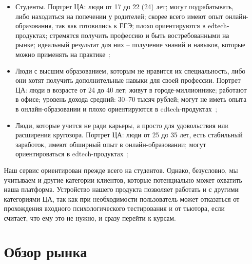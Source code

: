 \documentclass[12pt]{article}
\begin{document}
\begin{itemize}
    \item Студенты. Портрет ЦА: люди от 17 до 22 (24) лет; могут подрабатывать, либо находиться на попечении у родителей; скорее всего имеют опыт онлайн-образования, так как готовились к ЕГЭ; плохо ориентируются в edtech-продуктах; стремятся получить профессию и быть востребованными на рынке; идеальный результат для них -- получение знаний и навыков, которые можно применять на практике~\cite{TinkoffStudy};
    \item Люди с высшим образованием, которым не нравится их специальность, либо они хотят получить дополнительные навыки для своей профессии. Портрет ЦА: люди в возрасте от 24 до 40 лет; живут в городе-миллионнике; работают в офисе; уровень дохода средний: 30–70 тысяч рублей; могут не иметь опыта в онлайн-образовании и плохо ориентируются в edtech-продуктах~\cite{TinkoffStudy};
    \item Люди, которые учится не ради карьеры, а просто для удовольствия или расширения кругозора. Портрет ЦА: люди от 25 до 35 лет, есть стабильный заработок, имеют обширный опыт в онлайн-образовании; могут ориентироваться в edtech-продуктах~\cite{TinkoffStudy};
\end{itemize}

Наш сервис ориентирован прежде всего на студентов. Однако, безусловно, мы учитываем и другие категории клиентов, которые потенциально может охватить наша платформа. Устройство нашего продукта позволяет работать и с другими категориями ЦА, так как при необходимости пользователь может отказаться от прохождения входного психологического тестирования и от тьютора, если считает, что ему это не нужно, и сразу перейти к курсам. 

\section{Обзор рынка}
\end{document}
